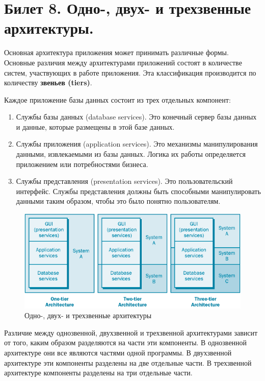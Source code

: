 \newpage
\section {Билет 8. Одно-, двух- и трехзвенные архитектуры.}

Основная архитектура приложения может принимать различные формы. Основные различия между архитектурами приложений состоят в количестве систем, участвующих в работе приложения. Эта классификация производится по количеству \textbf{звеньев (tiers)}.

Каждое приложение базы данных состоит из трех отдельных компонент:
\begin{enumerate}
	\item[\textbullet] Службы базы данных (database services). Это конечный сервер базы данных и данные, которые размещены в этой базе данных.
	\item[\textbullet] Службы приложения (application services). Это механизмы манипулирования данными, извлекаемыми из базы данных. Логика их работы определяется приложением или потребностями бизнеса.
	\item[\textbullet] Службы представления (presentation services). Это пользовательский интерфейс. Службы представления должны быть способными манипулировать данными таким образом, чтобы это было понятно пользователям.
\end{enumerate}

\begin{figure}[h]
	\centering
	\includegraphics[scale=0.75]{8/08_01.png}
	\caption{Одно-, двух- и трехзвенные архитектуры}
\end{figure}

Различие между однозвенной, двухзвенной и трехзвенной архитектурами зависит от того, каким образом разделяются на части эти компоненты. В однозвенной архитектуре они все являются частями одной программы. В двухзвенной архитектуре эти компоненты разделены на две отдельные части. В трехзвенной архитектуре компоненты разделены на три отдельные части.

